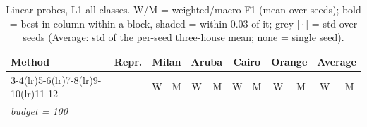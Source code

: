 \begin{table}[H]
\centering\small
\caption{Linear probes, L1 all classes. W/M = weighted/macro F1 (mean over seeds); bold = best in column within a block, shaded = within 0.03 of it; grey [\,$\cdot$\,] = std over seeds (Average: std of the per-seed three-house mean; none = single seed).}
\label{tab:probe_l1_all}
\setlength{\tabcolsep}{3.2pt}
\begin{tabular}{llcc|cc|cc|cc|cc}
\toprule
Method & Repr. & \multicolumn{2}{c}{Milan} & \multicolumn{2}{c}{Aruba} & \multicolumn{2}{c}{Cairo} & \multicolumn{2}{c}{Orange} & \multicolumn{2}{c}{Average} \\
\cmidrule(lr){3-4}\cmidrule(lr){5-6}\cmidrule(lr){7-8}\cmidrule(lr){9-10}\cmidrule(lr){11-12}
 & & W & M & W & M & W & M & W & M & W & M \\
\midrule
\multicolumn{12}{l}{\textit{budget = 100}} \\
\midrule

\end{tabular}
\end{table}
